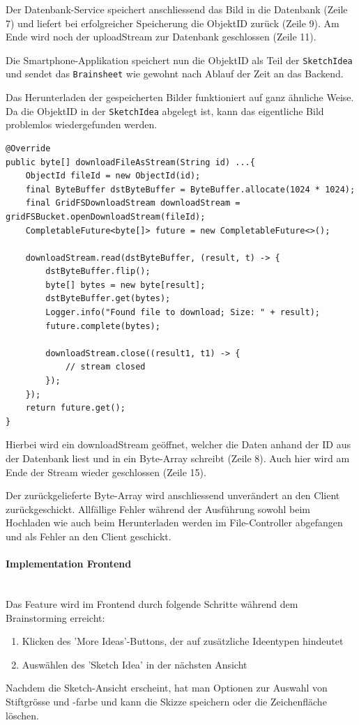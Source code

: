 Der Datenbank-Service speichert anschliessend das Bild in die Datenbank (Zeile 7) und liefert bei erfolgreicher Speicherung die ObjektID zurück (Zeile 9). Am Ende wird noch der uploadStream zur Datenbank geschlossen (Zeile 11).

Die Smartphone-Applikation speichert nun die ObjektID als Teil der \texttt{SketchIdea} und sendet das \texttt{Brainsheet} wie gewohnt nach Ablauf der Zeit an das Backend.

Das Herunterladen der gespeicherten Bilder funktioniert auf ganz ähnliche Weise. Da die ObjektID in der \texttt{SketchIdea} abgelegt ist, kann das eigentliche Bild problemlos wiedergefunden werden.

\begin{lstlisting}[caption={Download File im DB Service}, label=uploadFileDBService]
@Override
public byte[] downloadFileAsStream(String id) ...{
    ObjectId fileId = new ObjectId(id);
    final ByteBuffer dstByteBuffer = ByteBuffer.allocate(1024 * 1024);
    final GridFSDownloadStream downloadStream = gridFSBucket.openDownloadStream(fileId);
    CompletableFuture<byte[]> future = new CompletableFuture<>();

    downloadStream.read(dstByteBuffer, (result, t) -> {
        dstByteBuffer.flip();
        byte[] bytes = new byte[result];
        dstByteBuffer.get(bytes);
        Logger.info("Found file to download; Size: " + result);
        future.complete(bytes);

        downloadStream.close((result1, t1) -> {
            // stream closed
        });
    });
    return future.get();
}
\end{lstlisting}

Hierbei wird ein downloadStream geöffnet, welcher die Daten anhand der ID aus der Datenbank liest und in ein Byte-Array schreibt (Zeile 8). Auch hier wird am Ende der Stream wieder geschlossen (Zeile 15).

Der zurückgelieferte Byte-Array wird anschliessend unverändert an den Client zurück\-geschickt. Allfällige Fehler während der Ausführung sowohl beim Hochladen wie auch beim Herunterladen werden im File-Controller abgefangen und als Fehler an den Client geschickt.

\paragraph*{Implementation Frontend}~\\
Das Feature wird im Frontend durch folgende Schritte während dem Brainstorming erreicht:
\begin{enumerate}
	\item Klicken des 'More Ideas'-Buttons, der auf zusätzliche Ideentypen hindeutet
	\item Auswählen des 'Sketch Idea' in der nächsten Ansicht
\end{enumerate}
Nachdem die Sketch-Ansicht erscheint, hat man Optionen zur Auswahl von Stiftgrösse und -farbe und kann die Skizze speichern oder die Zeichenfläche löschen.

